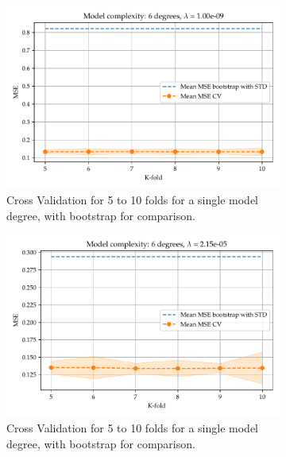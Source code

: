 \documentclass[11pt, a4paper]{article}
\begin{document}
\begin{figure}
  \centering
  \begin{subfigure}{0.49\textwidth}
      \centering
      \includegraphics[width=\textwidth]{figures/EX4_mse_cv_boot06.pdf}
      \caption{\label{fig:mse_cv_ridge_1}Cross Validation for 5 to 10 folds for a single model degree, with bootstrap for comparison.}
  \end{subfigure}
  \hfill
  \begin{subfigure}{0.49\textwidth}  
    \centering
    \includegraphics[width=\textwidth]{figures/EX4_mse_cv_boot16.pdf}
    \caption{\label{fig:mse_cv_ridge_2}Cross Validation for 5 to 10 folds for a single model degree, with bootstrap for comparison.}
  \end{subfigure}
  \hfill
  \begin{subfigure}{0.49\textwidth}  
    \centering

\end{subfigure}
\end{figure}
\end{document}

